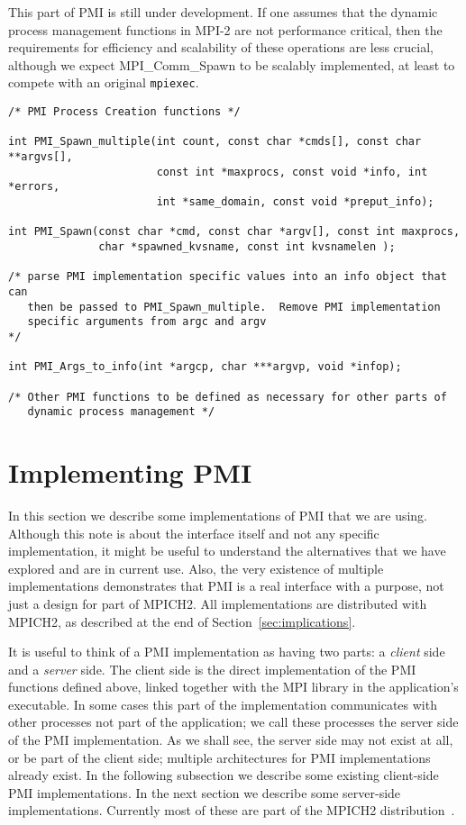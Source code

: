 \documentclass[11pt]{article}
\begin{document}
This part of PMI is still under development.  If one assumes that the
dynamic process management functions in MPI-2 are not performance
critical, then the requirements for efficiency and scalability of these
operations are less crucial, although we expect MPI\_Comm\_Spawn to be
scalably implemented, at least to compete with an original {\tt mpiexec}.

\begin{small}
\begin{verbatim}
/* PMI Process Creation functions */

int PMI_Spawn_multiple(int count, const char *cmds[], const char **argvs[], 
                       const int *maxprocs, const void *info, int *errors, 
                       int *same_domain, const void *preput_info);

int PMI_Spawn(const char *cmd, const char *argv[], const int maxprocs,
              char *spawned_kvsname, const int kvsnamelen );

/* parse PMI implementation specific values into an info object that can
   then be passed to PMI_Spawn_multiple.  Remove PMI implementation
   specific arguments from argc and argv
*/

int PMI_Args_to_info(int *argcp, char ***argvp, void *infop);

/* Other PMI functions to be defined as necessary for other parts of
   dynamic process management */

\end{verbatim}
\end{small}

\section{Implementing PMI}
\label{sec:implementing}

In this section we describe some implementations of PMI that we are
using.  Although this note is about the interface itself and not any
specific implementation, it might be useful to understand the
alternatives that we have explored and are in current use.  Also, the
very existence of multiple implementations demonstrates that PMI is
a real interface with a purpose, not just a design for part of MPICH2.
All implementations are distributed with MPICH2, as described at the end
of Section~\ref{sec:implications}.

It is useful to think of a PMI implementation as having two parts: a 
{\em client\/} side and a {\em server\/} side.  The client side is the
direct implementation of the PMI functions defined above, linked together
with the MPI library in the application's executable.  In some cases this
part of the implementation communicates with other processes not part of
the application;  we call these processes the server side of the PMI
implementation.  As we shall see, the server side may not exist at all,
or be part of the client side; multiple architectures for PMI
implementations already exist.  In the following subsection we describe some
existing client-side PMI implementations.  In the next section we
describe some server-side implementations.  Currently most of these are
part of the MPICH2 distribution~\cite{mpich2-web-page}.
\end{document}
